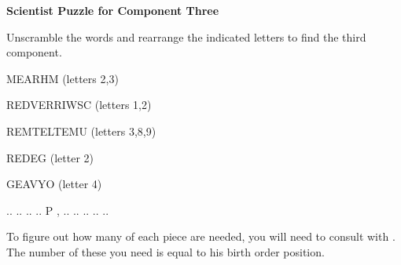 \documentclass[white]{guildcamp3}
\begin{document}
\name{\wSciPuzzleThree{}} %

\large\textbf{Scientist Puzzle for Component Three}  


Unscramble the words and rearrange the indicated letters to find the third component.

MEARHM (letters 2,3)

REDVERRIWSC (letters 1,2)

REMTELTEMU (letters 3,8,9)

REDEG (letter 2)

GEAVYO (letter 4)

.. .. .. .. P  ,  .. .. .. .. ..


To figure out how many of each piece are needed, you will need to consult with \cSpecOpOne{\intro}. The number of these you need is equal to his birth order position. 
\end{document}

